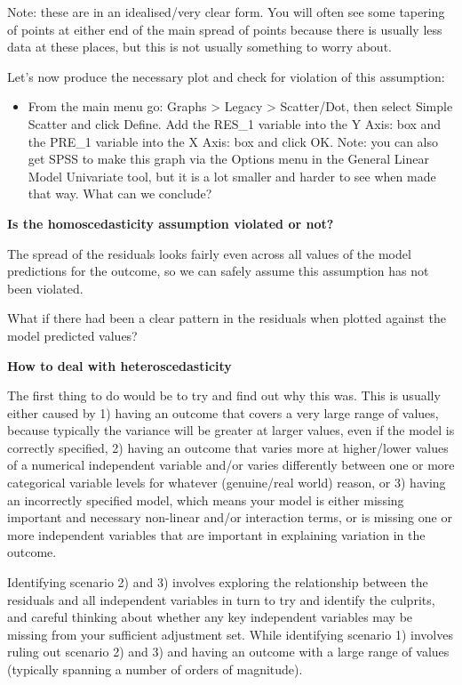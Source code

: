 \documentclass[
]{book}
\providecommand{\tightlist}{%
  \setlength{\itemsep}{0pt}\setlength{\parskip}{0pt}}
\begin{document}
Note: these are in an idealised/very clear form. You will often see some tapering of points at either end of the main spread of points because there is usually less data at these places, but this is not usually something to worry about.

Let's now produce the necessary plot and check for violation of this assumption:

\begin{itemize}
\tightlist
\item
  From the main menu go: Graphs \textgreater{} Legacy \textgreater{} Scatter/Dot, then select Simple Scatter and click Define. Add the RES\_1 variable into the Y Axis: box and the PRE\_1 variable into the X Axis: box and click OK. Note: you can also get SPSS to make this graph via the Options menu in the General Linear Model Univariate tool, but it is a lot smaller and harder to see when made that way. What can we conclude?
\end{itemize}

\textbf{Is the homoscedasticity assumption violated or not?}

The spread of the residuals looks fairly even across all values of the model predictions for the outcome, so we can safely assume this assumption has not been violated.

What if there had been a clear pattern in the residuals when plotted against the model predicted values?

\textbf{How to deal with heteroscedasticity}

The first thing to do would be to try and find out why this was. This is usually either caused by 1) having an outcome that covers a very large range of values, because typically the variance will be greater at larger values, even if the model is correctly specified, 2) having an outcome that varies more at higher/lower values of a numerical independent variable and/or varies differently between one or more categorical variable levels for whatever (genuine/real world) reason, or 3) having an incorrectly specified model, which means your model is either missing important and necessary non-linear and/or interaction terms, or is missing one or more independent variables that are important in explaining variation in the outcome.

Identifying scenario 2) and 3) involves exploring the relationship between the residuals and all independent variables in turn to try and identify the culprits, and careful thinking about whether any key independent variables may be missing from your sufficient adjustment set. While identifying scenario 1) involves ruling out scenario 2) and 3) and having an outcome with a large range of values (typically spanning a number of orders of magnitude).
\end{document}
